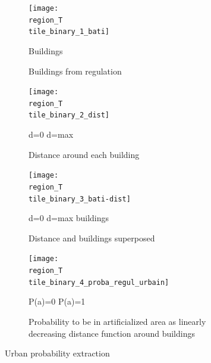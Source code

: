 \documentclass[10pt]{article}
\newcommand{\tile}{41000_30000}
\newcommand{\region}{finistere}
\begin{document}
\begin{figure}[H]
    \centering
    \begin{subfigure}{0.49\textwidth}
        \centering
        \texttt{[image: \\region\_T\\tile\_binary\_1\_bati]}
        \caption{Buildings from regulation}
        {\vspace{3mm}
            \small\centering
            \quad Buildings
        }
    \end{subfigure}
    \begin{subfigure}{0.49\textwidth}
        \centering
        \texttt{[image: \\region\_T\\tile\_binary\_2\_dist]}
        \caption{Distance around each building}
        {\vspace{3mm}
            \small\centering
            \quad d=0 
            \quad d=max
        }
    \end{subfigure}
    \begin{subfigure}{0.49\textwidth}
        \centering
        \texttt{[image: \\region\_T\\tile\_binary\_3\_bati-dist]}
        \caption{Distance and buildings superposed}
        {\vspace{3mm}
            \small\centering
            \quad d=0 
            \quad d=max
             \quad buildings
        }
    \end{subfigure}
    \begin{subfigure}{0.49\textwidth}
        \centering
        \texttt{[image: \\region\_T\\tile\_binary\_4\_proba\_regul\_urbain]}
        \caption{Probability to be in artificialized area as linearly decreasing distance function around buildings}
        {\vspace{3mm}
            \small\centering
            \quad P(a)=0 
            \quad P(a)=1
        }
    \end{subfigure}
    \caption{Urban probability extraction}
    \label{fig:regul_fusion_steps}
\end{figure}
\end{document}
